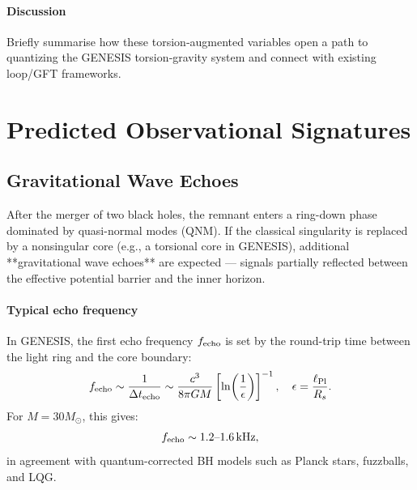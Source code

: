 \documentclass{article}
\begin{document}
\paragraph{Discussion}
Briefly summarise how these torsion‐augmented variables open a path to quantizing
the GENESIS torsion‐gravity system and connect with existing loop/GFT frameworks.

\medskip
\begin{center}
\end{center}
\medskip


\section{Predicted Observational Signatures}
\label{sec:observational_tests}

\subsection{Gravitational Wave Echoes}
\label{sec:gw_echoes}

After the merger of two black holes, the remnant enters a ring-down phase dominated by quasi-normal modes (QNM). If the classical singularity is replaced by a nonsingular core (e.g., a torsional core in GENESIS), additional **gravitational wave echoes** are expected — signals partially reflected between the effective potential barrier and the inner horizon.

\paragraph{Typical echo frequency}

In GENESIS, the first echo frequency \( f_{\rm echo} \) is set by the round-trip time between the light ring and the core boundary:
\[
f_{\rm echo} \sim \frac{1}{\Delta t_{\rm echo}} \sim \frac{c^3}{8\pi G M} \left[ \ln\!\left( \frac{1}{\epsilon} \right) \right]^{-1},
\quad \epsilon = \frac{\ell_{\rm Pl}}{R_s}.
\]
For \(M = 30 M_\odot\), this gives:
\[
f_{\rm echo} \sim 1.2\text{–}1.6\,\mathrm{kHz},
\]
in agreement with quantum-corrected BH models such as Planck stars, fuzzballs, and LQG.
\end{document}
